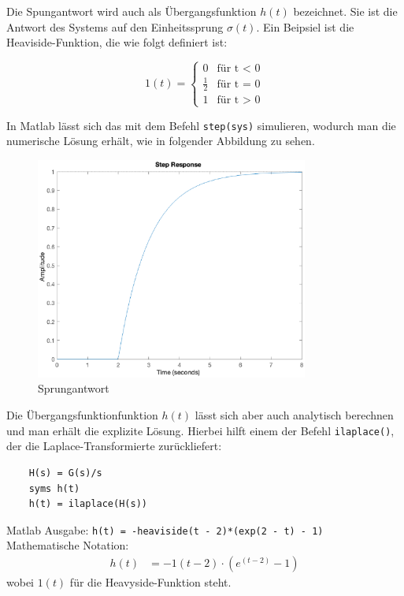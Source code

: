 Die Spungantwort wird auch als Übergangsfunktion $h(t)$ bezeichnet.
Sie ist die Antwort des Systems auf den Einheitssprung $\sigma (t)$.
Ein Beipsiel ist die Heaviside-Funktion, die wie folgt definiert ist:

\[
1 (t) = \begin{cases} 
    0 & \text{für t < 0} \\ 
    \frac{1}{2} & \text{für t = 0} \\
    1 & \text{für t > 0} \end{cases}  
\]

In Matlab lässt sich das mit dem Befehl \texttt{step(sys)} simulieren, wodurch man die numerische Lösung erhält, wie in folgender Abbildung zu sehen.

\begin{figure}[H]
    \label{fig:sprung}
    \centering
    \includegraphics[width=0.8\textwidth]{Bilder/SprungantwortPT1Tt.eps}
    \caption{Sprungantwort}
 \end{figure}

Die Übergangsfunktionfunktion $h(t)$ lässt sich aber auch analytisch berechnen und man erhält die explizite Lösung. Hierbei hilft einem der Befehl \texttt{ilaplace()}, der die Laplace-Transformierte zurückliefert:

\begin{verbatim}
    H(s) = G(s)/s
    syms h(t)
    h(t) = ilaplace(H(s))
\end{verbatim} 

Matlab Ausgabe: \texttt{h(t) = -heaviside(t - 2)*(exp(2 - t) - 1)}\\
Mathematische Notation: 
\begin{align*}
    h(t) &= -1(t-2)\cdot(e^{(t-2)}-1)
\end{align*} wobei $1(t)$ für die Heavyside-Funktion steht.



